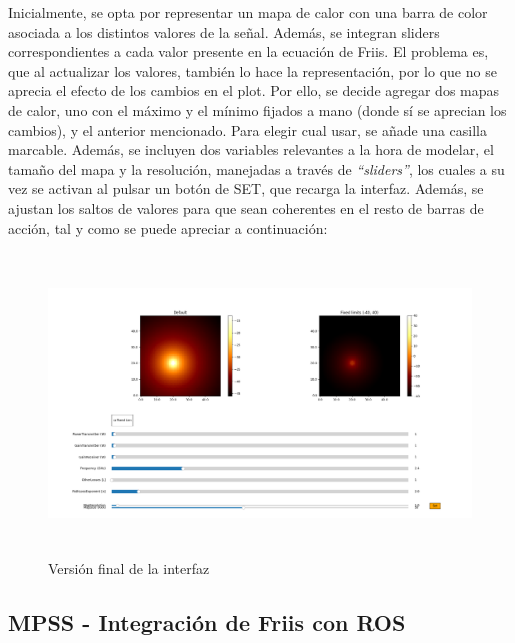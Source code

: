Inicialmente, se opta por representar un mapa de calor con una barra de color asociada a los distintos valores de la señal. Además, se integran sliders correspondientes a cada valor presente en la ecuación de Friis. El problema es, que al actualizar los valores, también lo hace la representación, por lo que no se aprecia el efecto de los cambios en el plot. Por ello, se decide agregar dos mapas de calor, uno con el máximo y el mínimo fijados a mano (donde sí se aprecian los cambios), y el anterior mencionado. Para elegir cual usar, se añade una casilla marcable. Además, se incluyen dos variables relevantes a la hora de modelar, el tamaño del mapa y la resolución, manejadas a través de \emph{``sliders''}, los cuales a su vez se activan al pulsar un botón de SET, que recarga la interfaz. Además, se ajustan los saltos de valores para que sean coherentes en el resto de barras de acción, tal y como se puede apreciar a continuación:\\

\begin{figure} [tp]
    \begin{center}
    \includegraphics[height=8cm]{imagenes/cap4/7_Friss_endGUI.png}
    \end{center}
	\caption[Versión final de la interfaz]{Versión final de la interfaz}
	\label{fig:friis_end_app}
\end{figure}

\subsection{\ac{MPSS} - Integración de Friis con \ac{ROS}}
\label{subsec:friis-ros}

